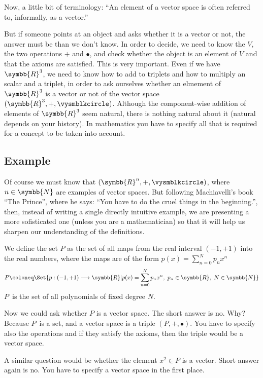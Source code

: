 Now, a little bit of terminology:
``An element of a vector space is often referred to, informally, as a vector.''

But if someone points at an object and asks whether it is a vector or not, the answer must be than
we don't know. In order to decide, we need to know the $V$, the two operations $+$ and
$\vysmblkcircle$, and check whether the object is an element of $V$ and that the axioms are
satisfied.
This is very important. Even if we have $\symbb{R}^3$, we need to know how to add to triplets
and how to multiply an scalar and a triplet, in order to ask ourselves whether an elmement of
$\symbb{R}^3$ is a vector or not of the vector space $(\symbb{R}^3, +, \vysmblkcircle)$.
Although the component-wise addition of elements of $\symbb{R}^3$ seem natural, there is nothing
natural about it (natural depends on your history). In mathematics you have to specify all that
is required for a concept to be taken into account.

\subsection{Example}\label{subsect:PolynomialExample}
Of course we must know that $(\symbb{R}^n, +, \vysmblkcircle)$, where $n\in\symbb{N}$ are examples
of vector spaces. But following Machiavelli's book ``The Prince'', where he says:
``You have to do the cruel things in the beginning.'', then, instead of writing a single directly
intuitive example\footnotemark{}, we are presenting a more sofisticated one (unless you are a
mathematician) so that it will help us sharpen our understanding of the definitions.

We define the set $P$ as the set of all maps from the real interval $(-1,+1)$ into the real
numbers, where the maps are of the form $p(x) = \sum_{n=0}^N p_n x^n$
\[
  P\coloneq\Set{p : (-1,+1) \longrightarrow \symbb{R} |
    p(x)= \sum_{n=0}^N p_n x^n, \kern3.pt p_n\in\symbb{R}, \kern3.pt N\in\symbb{N}}
\]
$P$\, is the set of all polynomials of fixed degree $N$.

Now we could ask whether $P$ is a vector space. The short answer is no.
Why? Because $P$\, is a set, and a vector space is a triple $(P,+,\vysmblkcircle)$.
You have to specify also the operations and if they satisfy the axioms, then the triple would be a
vector space.

A similar question would be whether the element $x^2\in P$ is a vector. Short answer again is no.
You have to specify a vector space in the first place\footnotemark{}.

